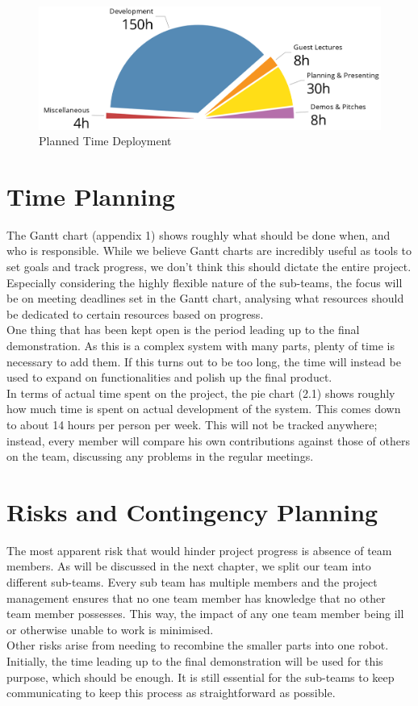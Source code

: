 \documentclass[a4paper,10pt,DIV10,openright,openbib]{scrreprt}
\begin{document}
\begin{figure}[h]
  \includegraphics[width=\textwidth]{pie.png}
  \caption{Planned Time Deployment}
\end{figure}

\section{Time Planning}
The Gantt chart (appendix 1) shows roughly what should be done when, and who is responsible.
While we believe Gantt charts are incredibly useful as tools to set goals and track
progress, we don't think this should dictate the entire project. Especially considering
the highly flexible nature of the sub-teams, the focus will be on meeting deadlines set
in the Gantt chart, analysing what resources should be dedicated to certain
resources based on progress.\\
One thing that has been kept open is the period leading up to the final demonstration.
As this is a complex system with many parts, plenty of time is necessary to add them.
If this turns out to be too long, the time will instead be used to expand on functionalities
and polish up the final product.\\
In terms of  actual time spent on the project, the pie chart (2.1) shows roughly how
much time is spent on actual development of the system. This comes down to about
14 hours per person per week. This will not be tracked anywhere; instead, every member
will compare his own contributions against those of others on the team, discussing any
problems in the regular meetings.

\section{Risks and Contingency Planning}
The most apparent risk that would hinder project progress is absence of team members. 
As will be discussed in the next chapter, we split our team into different sub-teams. 
Every sub team has multiple members and the project management ensures that no 
one team member has knowledge that no other 
team member possesses. This way, the impact of any one team member being ill or 
otherwise unable to work is minimised.\\
Other risks arise from needing to recombine 
the smaller parts into one robot. Initially, the time leading up to the final demonstration
will be used for this purpose, which should be enough. It is still essential for the 
sub-teams to keep communicating to keep this process as straightforward as possible.
\end{document}
